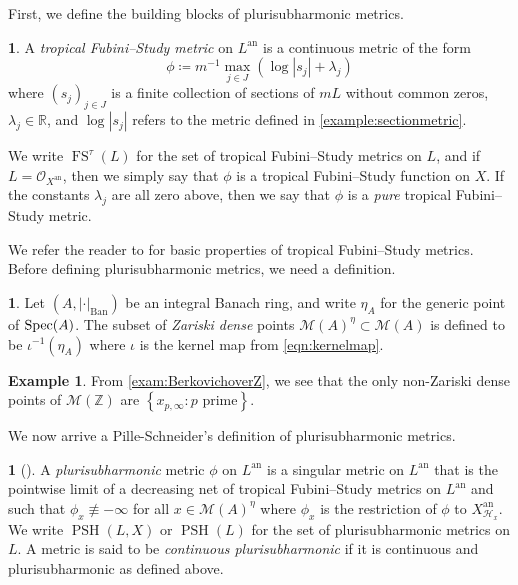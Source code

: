 \documentclass[11pt,reqno]{amsart}
\newcommand{\mZ}{\mathbb{Z}}
\newcommand{\mR}{\mathbb{R}}
\newcommand{\mQ}{\mathbb{Q}}
\newcommand{\cO}{\mathcal{O}}
\newcommand{\brk}[1]{ \left\lbrace #1 \right\rbrace }
\newcommand{\sH}{{\mathscr H}}
\newcommand{\sM}{{\mathscr M}}
\theoremstyle{theorem}
\numberwithin{equation}{subsection}
\numberwithin{equation}{subsection}
\theoremstyle{definition}
\newtheorem{definition}[subsubsection]{\text{Definition}}
\newtheorem{example}[subsubsection]{Example}
\theoremstyle{remark}
\numberwithin{equation}{subsubsection} \numberwithin{figure}{section}
\DeclareMathOperator{\an}{an}
\newcommand{\cdef}[1]{\textsf{\textit{#1}}}
\DeclareMathOperator{\FS}{FS}
\DeclareMathOperator{\pFS}{p.FS^{\tau}}
\DeclareMathOperator{\Ban}{Ban}
\DeclareMathOperator{\PSH}{PSH}
\begin{document}
First, we define the building blocks of plurisubharmonic metrics. 

\begin{definition}\label{defn:tropicalFS}
A \cdef{tropical Fubini--Study metric} on $L^{\an}$ is a continuous metric of the form
\[
\phi \coloneqq m^{-1} \max_{j\in J}(\log |s_j| + \lambda_j)
\]
where $(s_j)_{j\in J}$ is a finite collection of sections of $mL$ without common zeros, $\lambda_j \in \mR$, and $\log |s_j|$ refers to the metric defined in \autoref{example:sectionmetric}. 


We write $\FS^{\tau}(L)$ for the set of tropical Fubini--Study metrics on $L$, and if $L = \cO_{X^{\an}}$, then we simply say that $\phi$ is a tropical Fubini--Study function on $X$. 
If the constants $\lambda_j$ are all zero above, then we say that $\phi$ is a \cdef{pure} tropical Fubini--Study metric.
\end{definition}

We refer the reader to \cite[Proposition 2.14]{PilleSchneider:Global} for basic properties of tropical Fubini--Study metrics. 
Before defining plurisubharmonic metrics, we need a definition.

\begin{definition}\label{defn:Zariksidensepoints}
Let $(A,|\cdot|_{\Ban})$ be an integral Banach ring, and write $\eta_A$ for the generic point of $\operatorname{Spec}(A)$. 
The subset of \cdef{Zariski dense} points $\sM(A)^{\eta} \subset \sM(A)$ is defined to be $\iota^{-1}(\eta_A)$ where $\iota$ is the kernel map from \eqref{eqn:kernelmap}. 
\end{definition}

\begin{example}
From \autoref{exam:BerkovichoverZ}, we see that the only non-Zariski dense points of $\sM(\mZ)$ are $\brk{x_{p,\infty} : p \text{ prime}}$. 
\end{example}

We now arrive a Pille-Schneider's definition of plurisubharmonic metrics. 


\begin{definition}[]\label{defn:psh}
A \cdef{plurisubharmonic} metric $\phi$ on $L^{\an}$ is a singular metric on $L^{\an}$ that is the pointwise limit of a decreasing net of tropical Fubini--Study metrics on $L^{\an}$ and such that $\phi_x \not\equiv -\infty$ for all $x\in \sM(A)^{\eta}$ where $\phi_x$ is the restriction of $\phi$ to $X^{\an}_{\sH_x}$. 
We write $\PSH(L,X)$ or $\PSH(L)$ for the set of plurisubharmonic metrics on $L$. 
A metric is said to be \cdef{continuous plurisubharmonic} if it is continuous and plurisubharmonic as defined above. 
\end{definition}
\end{document}
